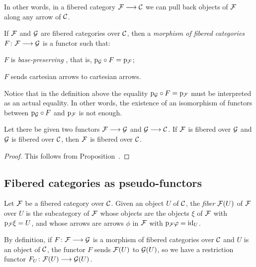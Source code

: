 \begin{3   FIBERED CATEGORIES}
\begin{3.1 Fibered categories}
In other words, in a fibered category $\cF \arr \cC$  we can pull back objects of $\mathcal{F}$ along any arrow of $\mathcal{C}$.

\begin{definition}
If $\mathcal{F}$ and $\mathcal{G}$ are fibered categories over $\mathcal{C}$, then a \emph{morphism of fibered categories}%
%
 $F \colon \cF \arr \cG$ is a functor such that:

\begin{enumeratei}
\item $F$ is \emph{base-preserving}%
%
, that is, $\mathrm{p}_{\mathcal{G}} \circ F = \mathrm{p}_{\mathcal{F}}$; \item $F$ sends cartesian arrows to cartesian arrows.
\end{enumeratei}
\end{definition}

Notice that in the definition above the equality $\mathrm{p}_{\mathcal{G}} \circ F = \mathrm{p}_{\mathcal{F}}$ must be interpreted as an actual equality. In other words, the existence of an isomorphism of functors between $\mathrm{p}_{\mathcal{G}} \circ F$ and $\mathrm{p}_{\mathcal{F}}$ is not enough.
 
\begin{proposition}
Let there be given two functors $\cF \arr \cG$ and $\cG \arr \cC$. If $\mathcal{F}$ is fibered over $\mathcal{G}$ and $\mathcal{G}$ is fibered over $\mathcal{C}$, then $\mathcal{F}$ is fibered over $\mathcal{C}$.
\end{proposition}

\begin{proof}
This follows from Proposition~.
\end{proof}


\subsection{Fibered categories as pseudo-functors}

\begin{definition} Let $\mathcal{F}$ be a fibered category over $\mathcal{C}$. Given an object $U$ of $\mathcal{C}$, the \emph{fiber}%
%
 $\mathcal{F}(U)$ of $\mathcal{F}$ over $U$ is the subcategory of $\mathcal{F}$ whose objects are the objects $\xi$ of $\mathcal{F}$ with $\mathrm{p}_{\mathcal{F}} \xi = U$, and whose arrows are arrows $\phi$ in $\mathcal{F}$ with $\mathrm{p}_{\mathcal{F}} \varphi = \mathrm{id}_U$.
\end{definition}

By definition, if $F \colon \cF \arr \cG$ is a morphism of fibered categories over $\mathcal{C}$ and $U$ is an object of $\mathcal{C}$, the functor $F$ sends $\mathcal{F}(U)$ to $\mathcal{G}(U)$, so we have a restriction functor $F_U \colon \cF(U) \arr \cG(U)$.


\end{3.1 Fibered categories}
\end{3   FIBERED CATEGORIES}
